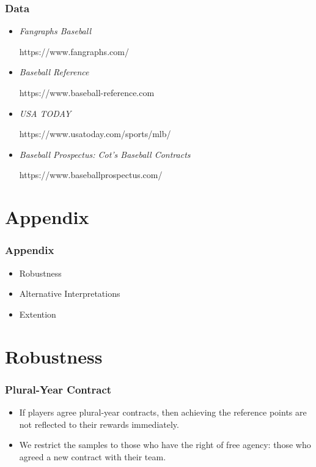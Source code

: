 \documentclass[dvipdfmx,12pt]{beamer}
\begin{document}
\begin{frame}\frametitle{Data}
  \begin{itemize}
    \item \textit{Fangraphs Baseball}

    https://www.fangraphs.com/

    \item \textit{Baseball Reference}

    https://www.baseball-reference.com

    \item \textit{USA TODAY}

    https://www.usatoday.com/sports/mlb/

    \item \textit{Baseball Prospectus: Cot's Baseball Contracts}

    https://www.baseballprospectus.com/
  \end{itemize}
\end{frame}

\section*{Appendix}
\begin{frame}\frametitle{Appendix}
  \large
  \begin{itemize}

    \item Robustness

    \item Alternative Interpretations

    \item Extention
  \end{itemize}
\end{frame}

\section*{Robustness}

\begin{frame}\frametitle{Plural-Year Contract}
  \begin{itemize}
    \item If players agree plural-year contracts, then achieving the reference points are not reflected to their rewards immediately.

    \item We restrict the samples to those who have the right of free agency: those who agreed a new contract with their team.
  \end{itemize}
\end{frame}
\end{document}
